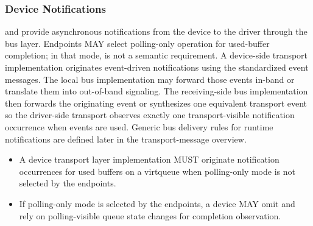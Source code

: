 \subsubsection{Device Notifications}
\label{sec:Virtio Transport Options / Virtio Over Messages / Device Operation / Device Notifications}

 and  provide asynchronous notifications
from the device to the driver through the bus layer. Endpoints MAY select
polling-only operation for used-buffer completion; in that mode,
 is not a semantic requirement. A device-side transport
implementation originates event-driven notifications using the standardized
event messages. The local bus implementation may forward those events in-band
or translate them into out-of-band signaling. The receiving-side bus
implementation then forwards the originating event or synthesizes one
equivalent transport event so the driver-side transport observes exactly one
transport-visible notification occurrence when events are used. Generic bus
delivery rules for runtime notifications are defined later in the
transport-message overview.
\begin{itemize}
  \item A device transport layer implementation MUST originate
         notification occurrences for used buffers on a
        virtqueue when polling-only mode is not selected by the endpoints.
  \item If polling-only mode is selected by the endpoints, a device MAY omit
         and rely on polling-visible queue state changes for
        completion observation.
\end{itemize}

